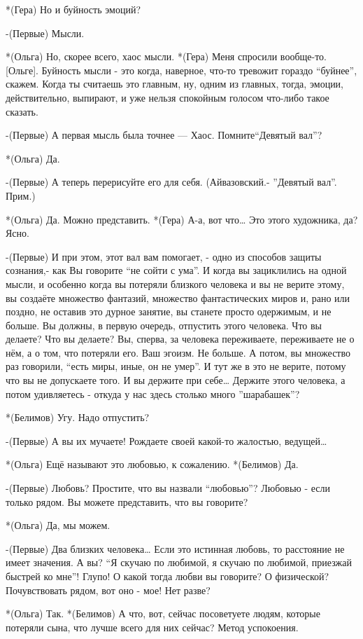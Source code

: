 *(Гера) Но и буйность эмоций?

-(Первые) Мысли.

*(Ольга) Но, скорее всего, хаос мысли.
*(Гера) Меня спросили вообще-то.[Ольге]. Буйность мысли - это когда, наверное, что-то тревожит гораздо “буйнее”, скажем. Когда ты считаешь это главным, ну, одним из главных, тогда, эмоции, действительно, выпирают, и уже нельзя спокойным голосом что-либо такое сказать.

-(Первые) А первая мысль была точнее — Хаос. Помните“Девятый вал”?

*(Ольга) Да.

-(Первые) А теперь перерисуйте его для себя. (Айвазовский.- ”Девятый вал”. Прим.)

*(Ольга) Да. Можно представить.
*(Гера) А-а, вот что…  Это этого художника, да? Ясно.

-(Первые) И при этом, этот вал вам помогает, - одно из способов защиты сознания,- как Вы говорите “не сойти с ума”. И когда вы зациклились на одной мысли, и особенно когда вы потеряли близкого человека и вы не верите этому, вы создаёте множество фантазий, множество фантастических миров и, рано или поздно, не оставив это дурное занятие,  вы станете просто одержимым, и не больше. Вы должны, в первую очередь, отпустить этого человека. Что вы делаете? Что вы делаете? Вы, сперва, за человека переживаете, переживаете не о нём, а о том, что потеряли его. Ваш эгоизм. Не больше. А потом, вы множество раз говорили, “есть миры, иные, он не умер”. И тут же в это не верите, потому что вы не допускаете того. И вы держите при себе… Держите этого человека, а потом удивляетесь - откуда у нас здесь столько много ”шарабашек”?

*(Белимов) Угу. Надо отпустить?

-(Первые) А вы их мучаете! Рождаете своей какой-то жалостью, ведущей…

*(Ольга) Ещё называют это любовью, к сожалению.
*(Белимов) Да.

-(Первые) Любовь? Простите, что вы назвали “любовью”? Любовью - если только рядом. Вы можете представить, что вы говорите?

*(Ольга) Да, мы можем.

-(Первые) Два близких человека… Если это истинная любовь, то расстояние не имеет значения. А вы? “Я скучаю по любимой, я скучаю по любимой, приезжай быстрей ко мне”! Глупо! О какой тогда любви вы говорите? О физической? Почувствовать рядом, вот оно - мое! Нет разве?

*(Ольга) Так.
*(Белимов) А что, вот, сейчас посоветуете людям, которые потеряли сына, что лучше всего для них сейчас? Метод успокоения.

